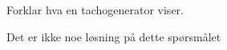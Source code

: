 

Forklar hva en tachogenerator viser. 







Det er ikke noe l{\o}sning p{\aa} dette sp{\o}rsm{\aa}let














